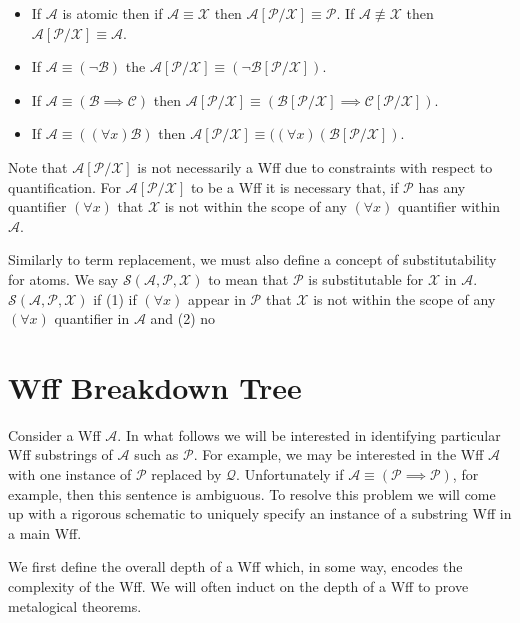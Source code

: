 \documentclass[12pt]{article}
\newcommand{\mc}[1]{\mathcal{#1}}
\begin{document}
\hrulefill
\begin{itemize}
\item{If $\mc{A}$ is atomic then if $\mc{A}\equiv \mc{X}$ then $\mc{A}[\mc{P}/\mc{X}] \equiv \mc{P}$. If $\mc{A}\not\equiv \mc{X}$ then $\mc{A}[\mc{P}/\mc{X}] \equiv \mc{A}$.}
\item{If $\mc{A} \equiv (\lnot \mc{B})$ the $\mc{A}[\mc{P}/\mc{X}] \equiv (\lnot \mc{B}[\mc{P}/\mc{X}])$.}
\item{If $\mc{A} \equiv (\mc{B} \implies \mc{C})$ then $\mc{A}[\mc{P}/\mc{X}] \equiv (\mc{B}[\mc{P}/\mc{X}] \implies \mc{C}[\mc{P}/\mc{X}])$.}
\item{If $\mc{A} \equiv ((\forall x)\mc{B})$ then $\mc{A}[\mc{P}/\mc{X}] \equiv ((\forall x) (\mc{B}[\mc{P}/\mc{X}])$.}
\end{itemize}
\hrulefill

Note that $\mc{A}[\mc{P}/\mc{X}]$ is not necessarily a Wff due to constraints with respect to quantification.
For $\mc{A}[\mc{P}/\mc{X}]$ to be a Wff it is necessary that, if $\mc{P}$ has any quantifier $(\forall x)$ that $\mc{X}$ is not within the scope of any $(\forall x)$ quantifier within $\mc{A}$.

Similarly to term replacement, we must also define a concept of substitutability for atoms. We say $\mc{S}(\mc{A}, \mc{P}, \mc{X})$ to mean that $\mc{P}$ is substitutable for $\mc{X}$ in $\mc{A}$. $\mc{S}(\mc{A}, \mc{P}, \mc{X})$ if (1) if $(\forall x)$ appear in $\mc{P}$ that $\mc{X}$ is not within the scope of any $(\forall x)$ quantifier in $\mc{A}$ and (2) no  

\section{Wff Breakdown Tree}

Consider a Wff $\mc{A}$.
In what follows we will be interested in identifying particular Wff substrings of $\mc{A}$ such as $\mc{P}$.
For example, we may be interested in the Wff $\mc{A}$ with one instance of $\mc{P}$ replaced by $\mc{Q}$.
Unfortunately if $\mc{A} \equiv (\mc{P} \implies \mc{P})$, for example, then this sentence is ambiguous. 
To resolve this problem we will come up with a rigorous schematic to uniquely specify an instance of a substring Wff in a main Wff.

We first define the overall depth of a Wff which, in some way, encodes the complexity of the Wff.
We will often induct on the depth of a Wff to prove metalogical theorems.

\hrulefill
\end{document}
